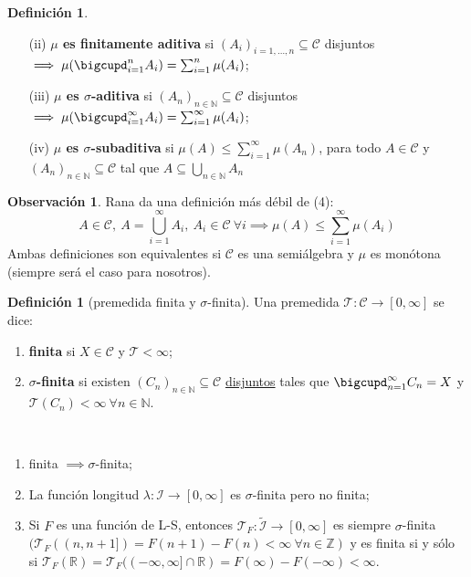 \documentclass[11pt]{article}
\theoremstyle{definition} %
\newtheorem{definition}[theorem]{Definición}
\newtheorem{remark}[theorem]{Observación}
\newcommand{\R}{\mathbb{R}}
\newcommand{\N}{\mathbb{N}}
\newcommand{\Z}{\mathbb{Z}}
\begin{document}
\begin{property}
\begin{definition}
\begin{enumerate}
			\item[(ii)] \textbf{$\mu$ es finitamente aditiva} si $(A_i)_{i=1,\dots,n} \subseteq \mathscr{C}$ disjuntos $\implies \mu(\bigcupd_{i=1}^{n} A_i) = \sum_{i=1}^{n} \mu(A_i)$;

			\item[(iii)] \textbf{$\mu$ es $\sigma$-aditiva} si $(A_n)_{n\in\N} \subseteq \mathscr{C}$ disjuntos $\implies \mu (\bigcupd_{i=1}^{\infty} A_i ) = \sum_{i=1}^{\infty} \mu(A_i)$;

			\item[(iv)] \textbf{$\mu$ es $\sigma$-subaditiva} si $\mu(A)\leq \sum_{i=1}^{\infty}\mu(A_n)$, para todo $A \in \mathscr{C}$ y $(A_n)_{n\in\N}\subseteq\mathscr{C}$ tal que $A \subseteq \bigcup_{n\in\N} A_n$
		\end{enumerate}
	\end{definition}

  \begin{remark}
	Rana da una definición más débil de (4):
	\[ A \in \mathscr{C},\ A = \bigcup_{i=1}^{\infty} A_i,\ A_i \in \mathscr{C}\ \forall i \implies \mu(A) \leq \sum_{i=1}^{\infty}\mu(A_i) \]
	\noindent Ambas definiciones son equivalentes si $\mathscr{C}$ es una semiálgebra y $\mu$ es monótona (siempre será el caso para nosotros).
\end{remark}

\begin{definition}[premedida finita y $\sigma$-finita]
	Una premedida $\mathcal{T} : \mathscr{C} \to [0,\infty]$ se dice:
	\begin{enumerate}
		\item \textbf{finita} si $X \in \mathscr{C}$ y $\mathcal{T} < \infty$;

		\item \textbf{$\sigma$-finita} si existen $(C_n)_{n\in\N} \subseteq \mathscr{C}$ \underline{disjuntos} tales que $\bigcupd_{n=1}^{\infty} C_n = X$ y $\mathcal{T} (C_n) < \infty\ \forall n \in \N$.
	\end{enumerate}
\end{definition}

\begin{eg}~
	\begin{enumerate}
		\item finita $\implies \sigma$-finita;

		\item La función longitud $\lambda : \mathcal{I} \to [0,\infty]$ es $\sigma$-finita pero no finita;

		\item Si $F$ es una función de L-S, entonces $\mathcal{T}_F : \widetilde{\mathcal{I}} \to [0,\infty]$ es siempre $\sigma$-finita $(\mathcal{T}_F ((n,n+1]) = F(n+1) - F(n) < \infty\ \forall n \in \Z)$ y es finita si y sólo si $\mathcal{T}_F (\R) = \mathcal{T}_F ((-\infty,\infty]\cap\R) = F(\infty)-F(-\infty) < \infty$.
	\end{enumerate}
\end{eg}


\end{property}
\end{document}
